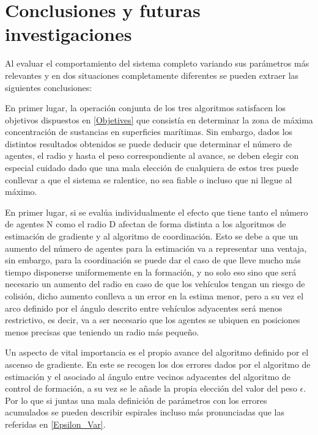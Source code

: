 \newpage
\thispagestyle{empty}
\mbox{}

\chapter{Conclusiones y futuras investigaciones}
\label{ch:chapter4}

Al evaluar el comportamiento del sistema completo variando sus parámetros más relevantes y en dos situaciones completamente diferentes se pueden extraer las siguientes conclusiones:

En primer lugar, la operación conjunta de los tres algoritmos satisfacen los objetivos dispuestos en \ref{Objetives} que consistía en determinar la zona de máxima concentración de sustancias en superficies marítimas. Sin embargo, dados los distintos resultados obtenidos se puede deducir que determinar el número de agentes, el radio y hasta el peso correspondiente al avance, se deben elegir con especial cuidado dado que una mala elección de cualquiera de estos tres puede conllevar a que el sistema se ralentice, no sea fiable o incluso que ni llegue al máximo.

En primer lugar, si se evalúa individualmente el efecto que tiene tanto el número de agentes N como el radio D afectan de forma distinta a los algoritmos de estimación de gradiente y al algoritmo de coordinación. Esto se debe a que un aumento del número de agentes para la estimación va a representar una ventaja, sin embargo, para la coordinación se puede dar el caso de que lleve mucho más tiempo disponerse uniformemente en la formación, y no solo eso sino que será necesario un aumento del radio en caso de que los vehículos tengan un riesgo de colisión, dicho aumento conlleva a un error en la estima menor, pero a su vez el arco definido por el ángulo descrito entre vehículos adyacentes será menos restrictivo, es decir, va a ser necesario que los agentes se ubiquen en posiciones menos precisas que teniendo un radio más pequeño.

Un aspecto de vital importancia es el propio avance del algoritmo definido por el ascenso de gradiente. En este se recogen los dos errores dados por el algoritmo de estimación y el asociado al ángulo entre vecinos adyacentes del algoritmo de control de formación, a su vez se le añade la propia elección del valor del peso $\epsilon$. Por lo que si juntas una mala definición de parámetros con los errores acumulados se pueden describir espirales incluso más pronunciadas que las referidas en \ref{Epsilon_Var}.

